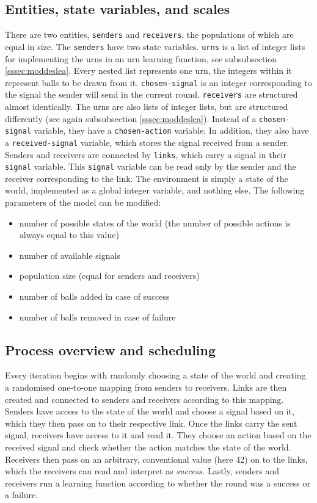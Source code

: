 \documentclass[
	DIV=calc,
	BCOR=0mm,
	pagesize,
]{scrartcl}
\newcommand{\code}[1]{\texttt{#1}}
\begin{document}
\subsection{Entities, state variables, and scales}
\label{ssec:modent}
There are two entities, \code{senders} and \code{receivers}, the populations of which are equal in size.
The \code{senders} have two state variables.
\code{urns} is a list of integer lists for implementing the urns in an urn learning function, see subsubsection \ref{sssec:moddeslea}.
Every nested list represents one urn, the integers within it represent balls to be drawn from it.
\code{chosen-signal} is an integer corresponding to the signal the sender will send in the current round.
\code{receivers} are structured almost identically.
The urns are also lists of integer lists, but are structured differently (see again subsubsection \ref{sssec:moddeslea}).
Instead of a \code{chosen-signal} variable, they have a \code{chosen-action} variable.
In addition, they also have a \code{received-signal} variable, which stores the signal received from a sender.
Senders and receivers are connected by \code{links}, which carry a signal in their \code{signal} variable.
This \code{signal} variable can be read only by the sender and the receiver corresponding to the link.
The environment is simply a state of the world, implemented as a global integer variable, and nothing else.
The following parameters of the model can be modified:
\begin{itemize}
	\item number of possible states of the world (the number of possible actions is always equal to this value)
	\item number of available signals
	\item population size (equal for senders and receivers)
	\item number of balls added in case of success
	\item number of balls removed in case of failure
\end{itemize}

\subsection{Process overview and scheduling}
\label{ssec:modpro}
Every iteration begins with randomly choosing a state of the world and creating a randomised one-to-one mapping from senders to receivers.
Links are then created and connected to senders and receivers according to this mapping.
Senders have access to the state of the world and choose a signal based on it, which they then pass on to their respective link.
Once the links carry the sent signal, receivers have access to it and read it.
They choose an action based on the received signal and check whether the action matches the state of the world.
Receivers then pass on an arbitrary, conventional value (here 42) on to the links, which the receivers can read and interpret as \emph{success.}
Lastly, senders and receivers run a learning function according to whether the round was a success or a failure.
\end{document}
